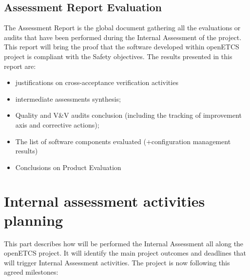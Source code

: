 \documentclass{template/openetcs_article}
\begin{document}
\subsection{Assessment Report Evaluation}
The Assessment Report is the global document gathering all the evaluations or audits that have been performed during the Internal Assessment of the project.
This report will bring the proof that the software developed within openETCS project is compliant with the Safety objectives.
The results presented in this report are:
 \begin{itemize}
\item justifications on cross-acceptance verification activities
\item intermediate assessments synthesis;
\item Quality and V\&V audits conclusion (including the tracking of improvement axis and corrective actions);
\item The list of software components evaluated (+configuration management results)
\item Conclusions on Product Evaluation
\end{itemize}

\section{Internal assessment activities planning}
This part describes how will be performed the Internal Assessment all along the openETCS project. It will identify the main project outcomes and deadlines that will trigger Internal Assessment activities. The project is now following this agreed milestones:
\end{document}
